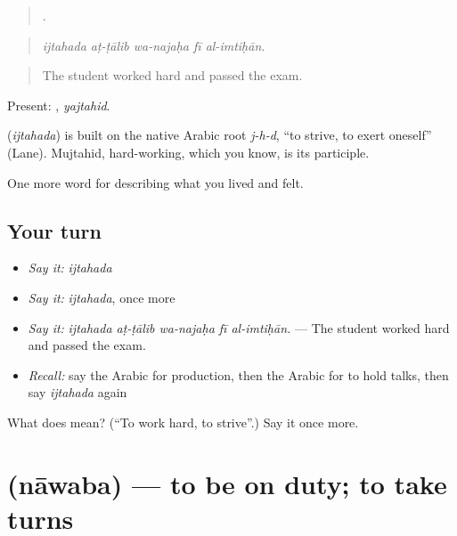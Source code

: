 \begin{quote}
    .
\end{quote}

\begin{quote}
\emph{ijtahada aṭ-ṭālib wa-najaḥa fī al-imtiḥān.}
\end{quote}

\begin{quote}
The student worked hard and passed the exam.
\end{quote}

Present: , \emph{yajtahid}.

\begin{cousinweb}
\textbf{} (\emph{ijtahada}) is built on the native Arabic root \emph{j-h-d}, \textquotedblleft{}to strive, to exert oneself\textquotedblright{} (Lane). Mujtahid, hard-working, which you know, is its participle.
\end{cousinweb}

\begin{grammarlens}[title={What you've built}]
One more word for describing what you lived and felt.
\end{grammarlens}

\subsection*{Your turn}
\begin{itemize}
\raggedright
  \item \emph{Say it:} \emph{ijtahada}
  \item \emph{Say it:} \emph{ijtahada}, once more
  \item \emph{Say it:} \emph{ijtahada aṭ-ṭālib wa-najaḥa fī al-imtiḥān.} — The student worked hard and passed the exam.
  \item \emph{Recall:} say the Arabic for production, then the Arabic for to hold talks, then say \emph{ijtahada} again
\end{itemize}

\begin{tcolorbox}[breakable,colback=teal!4,colframe=teal!35!black,title={Before you move on}]
What does  mean? (\textquotedblleft{}To work hard, to strive\textquotedblright{}.) Say it once more.
\end{tcolorbox}
\section[\texorpdfstring{\ar{ناوب} (nāwaba)}{ناوب (nāwaba)}]{ (nāwaba) — to be on duty; to take turns}

